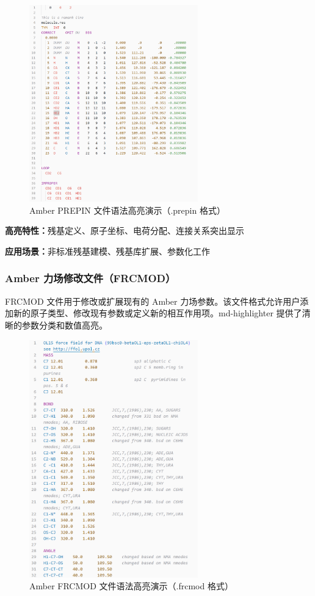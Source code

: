 \begin{figure}[!h]
    \centering
    \includegraphics[width=0.65\textwidth]{../images/prepin.png}
    \caption{Amber PREPIN 文件语法高亮演示（.prepin 格式）}
    \label{fig:prepin-highlighting}
\end{figure}

\textbf{高亮特性：}残基定义、原子坐标、电荷分配、连接关系突出显示

\textbf{应用场景：}非标准残基建模、残基库扩展、参数化工作

\subsubsection{Amber 力场修改文件（FRCMOD）}

FRCMOD 文件用于修改或扩展现有的 Amber 力场参数。该文件格式允许用户添加新的原子类型、修改现有参数或定义新的相互作用项。md-highlighter 提供了清晰的参数分类和数值高亮。

\begin{figure}[!h]
    \centering
    \includegraphics[width=0.65\textwidth]{../images/frcmod.png}
    \caption{Amber FRCMOD 文件语法高亮演示（.frcmod 格式）}
    \label{fig:frcmod-highlighting}
\end{figure}


